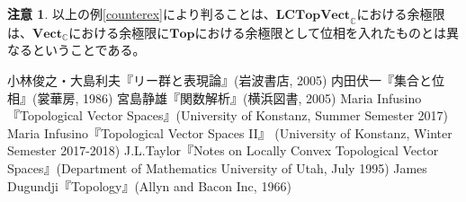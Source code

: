 ﻿\documentclass[12pt]{jsarticle}
\newcommand{\C}{\mathbb{C}}
\newcommand{\Top}{\textbf{Top}}
\newcommand{\Vect}{\textbf{Vect}_{\C}}
\newcommand{\LCTopVect}{\textbf{LCTopVect}_{\C}}
\theoremstyle{definition}%
\newtheorem{remark}[definition]{注意}
\begin{document}
\begin{remark}
  以上の例\ref{counterex}により判ることは、$\LCTopVect$における余極限は、$\Vect$における余極限に$\Top$における余極限として位相を入れたものとは異なるということである。
\end{remark}



\newpage
\begin{thebibliography}{1}%
   小林俊之・大島利夫『リー群と表現論』(岩波書店, 2005)
   内田伏一『集合と位相』(裳華房, 1986)
   宮島静雄『関数解析』(横浜図書, 2005)
   Maria Infusino『Topological Vector Spaces』(University of Konstanz, Summer Semester 2017)
   Maria Infusino『Topological Vector Spaces II』
 (University of Konstanz, Winter Semester 2017-2018)
 J.L.Taylor『Notes on Locally Convex Topological Vector Spaces』(Department of Mathematics University of Utah, July 1995)
James Dugundji『Topology』(Allyn and Bacon Inc, 1966)
\end{thebibliography}
\end{document}
